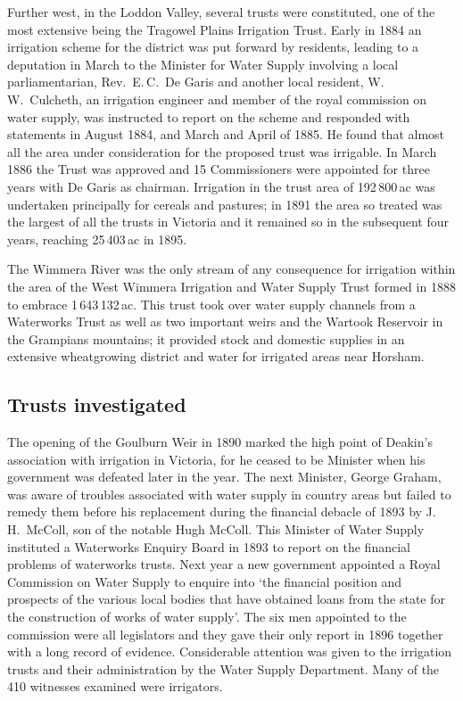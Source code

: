 Further west, in the Loddon Valley, several trusts were constituted,
one of the most extensive being the Tragowel Plains Irrigation Trust.
Early in 1884 an irrigation scheme for the district was put forward by
residents, leading to a deputation in March to the Minister for Water
Supply involving a local parliamentarian, Rev.~E.\,C.~De Garis and
another local resident, W.\,W.~Culcheth, an irrigation engineer and
member of the royal commission on water supply, was instructed to
report on the scheme and responded with statements in August 1884, and
March and April of 1885.  He found that almost all the area under
consideration for the proposed trust was irrigable.  In March 1886 the
Trust was approved and 15 Commissioners were appointed for three years
with De Garis as chairman.  Irrigation in the trust area of
192\,800\,ac was undertaken principally for cereals and pastures; in
1891 the area so treated was the largest of all the trusts in Victoria
and it remained so in the subsequent four years, reaching 25\,403\,ac
in 1895.

The Wimmera River was the only stream of any consequence for
irrigation within the area of the West Wimmera Irrigation and Water
Supply Trust formed in 1888 to embrace 1\,643\,132\,ac. This trust
took over water supply channels from a Waterworks Trust as well as two
important weirs and the Wartook Reservoir in the Grampians mountains;
it provided stock and domestic supplies in an extensive wheatgrowing
district and water for irrigated areas near Horsham.

\subsection*{Trusts investigated}

The opening of the Goulburn Weir in 1890 marked the high point of
Deakin's association with irrigation in Victoria, for he ceased to be
Minister when his government was defeated later in the year.  The next
Minister, George Graham, was aware of troubles associated with water
supply in country areas but failed to remedy them before his
replacement during the financial debacle of 1893 by J.\,H.~McColl, son
of the notable Hugh McColl.  This Minister of Water Supply instituted
a Waterworks Enquiry Board in 1893 to report on the financial problems
of waterworks trusts.  Next year a new government appointed a Royal
Commission on Water Supply to enquire into `the financial position and
prospects of the various local bodies that have obtained loans from
the state for the construction of works of water supply'. The six men
appointed to the commission were all legislators and they gave their
only report in 1896 together with a long record of evidence.
Considerable attention was given to the irrigation trusts and their
administration by the Water Supply Department.  Many of the 410
witnesses examined were irrigators.

